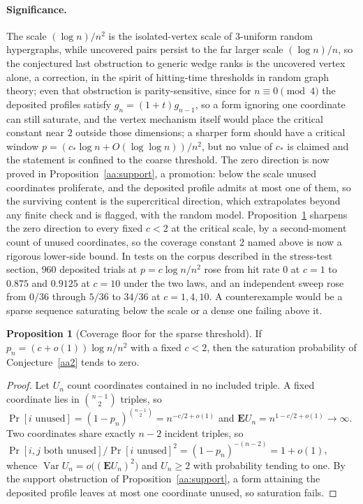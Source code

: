 \documentclass[11pt]{article}
\theoremstyle{definition}
\newtheorem{proposition}{Proposition}
\begin{document}
\paragraph{Significance.}
The scale $(\log n)/n^2$ is the isolated-vertex scale of $3$-uniform random hypergraphs, while uncovered pairs persist to the far larger scale $(\log n)/n$, so the conjectured last obstruction to generic wedge ranks is the uncovered vertex alone, a correction, in the spirit of hitting-time thresholds in random graph theory; even that obstruction is parity-sensitive, since for $n\equiv0\pmod4$ the deposited profiles satisfy $g_n=(1+t)g_{n-1}$, so a form ignoring one coordinate can still saturate, and the vertex mechanism itself would place the critical constant near $2$ outside those dimensions; a sharper form should have a critical window $p=(c_{*}\log n+O(\log\log n))/n^2$, but no value of $c_{*}$ is claimed and the statement is confined to the coarse threshold.  The zero direction is now proved in Proposition~\ref{aa:support}, a promotion: below the scale unused coordinates proliferate, and the deposited profile admits at most one of them, so the surviving content is the supercritical direction, which extrapolates beyond any finite check and is flagged, with the random model.  Proposition~\ref{aa:coverage} sharpens the zero direction to every fixed $c<2$ at the critical scale, by a second-moment count of unused coordinates, so the coverage constant $2$ named above is now a rigorous lower-side bound.  In tests on the corpus described in the stress-test section, $960$ deposited trials at $p=c\log n/n^2$ rose from hit rate $0$ at $c=1$ to $0.875$ and $0.9125$ at $c=10$ under the two laws, and an independent sweep rose from $0/36$ through $5/36$ to $34/36$ at $c=1,4,10$.  A counterexample would be a sparse sequence saturating below the scale or a dense one failing above it.

\begin{proposition}[Coverage floor for the sparse threshold]\label{aa:coverage}
If $p_n=(c+o(1))\log n/n^2$ with a fixed $c<2$, then the saturation probability of Conjecture~\ref{aa2} tends to zero.
\end{proposition}

\begin{proof}
Let $U_n$ count coordinates contained in no included triple.  A fixed coordinate lies in $\binom{n-1}2$ triples, so $\Pr[i\text{ unused}]=(1-p_n)^{\binom{n-1}2}=n^{-c/2+o(1)}$ and $\mathbf EU_n=n^{1-c/2+o(1)}\to\infty$.  Two coordinates share exactly $n-2$ incident triples, so $\Pr[i,j\text{ both unused}]/\Pr[i\text{ unused}]^2=(1-p_n)^{-(n-2)}=1+o(1)$, whence $\operatorname{Var}U_n=o\bigl((\mathbf EU_n)^2\bigr)$ and $U_n\ge2$ with probability tending to one.  By the support obstruction of Proposition~\ref{aa:support}, a form attaining the deposited profile leaves at most one coordinate unused, so saturation fails.
\end{proof}
\end{document}
